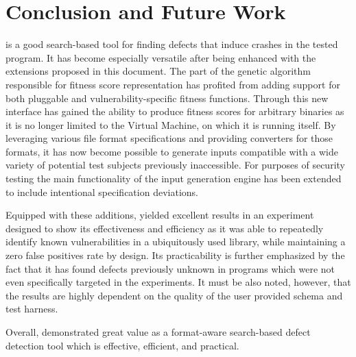 \section{Conclusion and Future Work}
\label{sec:conclusion}
\xmlmate is a good search-based tool for finding defects that induce crashes in the tested program. It has
become especially versatile after being enhanced with the extensions proposed in this document.
The part of the genetic algorithm responsible for fitness score representation has profited from adding
support for both pluggable and vulnerability-specific fitness functions. Through this new interface \xmlmate
has gained the ability to produce fitness scores for arbitrary binaries as it is no longer limited to
the \java Virtual Machine, on which it is running itself. By leveraging various file format specifications and
providing converters for those formats, it has now become possible to generate inputs compatible with a wide
variety of potential test subjects previously inaccessible. For purposes of security testing the main
functionality of the input generation engine has been extended to include intentional specification deviations.

Equipped with these additions, \xmlmate yielded excellent results in an experiment designed to show its
effectiveness and efficiency as it was able to repeatedly identify known vulnerabilities in a ubiquitously
used library, while maintaining a zero false positives rate by design.
Its practicability is further emphasized by the fact that it has found defects previously unknown in programs
which were not even specifically targeted in the experiments. 
It must be also noted, however, that the results are highly dependent on the quality of the user provided
schema and test harness.

\begin{mdframed}
Overall, \xmlmate demonstrated great value as a format-aware search-based defect detection tool which
is effective, efficient, and practical.
\end{mdframed}
